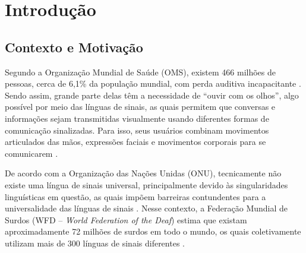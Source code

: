\chapter{Introdução}
\label{chapter:introducao}

\section{Contexto e Motivação}



Segundo a Organização Mundial de Saúde (OMS), existem 466 milhões de pessoas, cerca de 6,1\% da população mundial, com perda auditiva incapacitante \cite{OMS2018}. Sendo assim, grande parte delas têm a necessidade de ``ouvir com os olhos'', algo possível por meio das línguas de sinais, as quais permitem que conversas e informações sejam transmitidas visualmente usando diferentes formas de comunicação sinalizadas. Para isso, seus usuários combinam movimentos articulados das mãos, expressões faciais e movimentos corporais para se comunicarem \cite{Duke2009}.

De acordo com a Organização das Nações Unidas (ONU), tecnicamente não existe uma língua de sinais universal, principalmente devido às singularidades linguísticas em questão, as quais impõem barreiras contundentes para a universalidade das línguas de sinais \cite{ONU2019, Quadros2019}. Nesse contexto, a Federação Mundial de Surdos (WFD -- \textit{World Federation of the Deaf}) estima que existam aproximadamente 72 milhões de surdos em todo o mundo, os quais coletivamente utilizam mais de 300 línguas de sinais diferentes \cite{ONU2019}.

